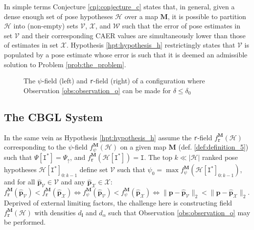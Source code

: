 In simple terms Conjecture \ref{cnj:conjecture_c} states that, in general,
given a dense enough set of pose hypotheses $\mathcal{H}$ over a map $\bm{M}$,
it is possible to partition $\mathcal{H}$ into (non-empty) sets $\mathcal{V}$,
$\mathcal{X}$, and $\mathcal{W}$ such that the error of pose estimates in set
$\mathcal{V}$ and their corresponding CAER values are simultaneously lower than
those of estimates in set $\mathcal{X}$. Hypothesis \ref{hpt:hypothesis_h}
restrictingly states that $\mathcal{V}$ is populated by a pose estimate
whose error is such that it is deemed an admissible solution to
Problem \ref{prob:the_problem}.

\begin{figure}
  
  \vspace{0.7cm}
  \caption{\small The $\psi$-field (left) and \texttt{r}-field (right) of a
           configuration where Observation \ref{obs:observation_o} can be made
           for $\delta \leq \delta_0$}
  \label{fig:h_fig1}
\end{figure}


\subsection{The CBGL System}

In the same vein as Hypothesis \ref{hpt:hypothesis_h} assume the \texttt{r}-field
$f_{\texttt{r}}^{\bm{M}}(\mathcal{H})$ corresponding to the $\psi$-field
$f_{\psi}^{\bm{M}}(\mathcal{H})$ on a given map $\bm{M}$ (def.
\ref{def:definition_5}) such that $\Psi[\texttt{I}^{\ast}] = \Psi_\uparrow$,
and $f_{\texttt{r}}^{\bm{M}}(\mathcal{H}[\texttt{I}^{\ast}]) = \texttt{I}$.
The top $k \ll |\mathcal{H}|$ ranked pose hypotheses
$\mathcal{H}[\texttt{I}^{\ast}]_{0:k-1}$ define set $\mathcal{V}$ such that
$\psi_0 = \max f_{\psi}^{\bm{M}}(\mathcal{H}[\texttt{I}^{\ast}]_{0:k-1})$,
and for all $\hat{\bm{p}}_\mathcal{V} \in \mathcal{V}$
and any $\hat{\bm{p}}_{\mathcal{X}} \in \mathcal{X}$:
$ f_{\texttt{r}}^{\bm{M}}(\hat{\bm{p}}_\mathcal{V}) < f_{\texttt{r}}^{\bm{M}}(\hat{\bm{p}}_{\mathcal{X}}) \Leftrightarrow
f_{\psi}^{\bm{M}}(\hat{\bm{p}}_\mathcal{V}) < f_{\psi}^{\bm{M}}(\hat{\bm{p}}_\mathcal{X}) \Leftrightarrow
\|\bm{p}-\hat{\bm{p}}_\mathcal{V}\|_2 < \|\bm{p}-\hat{\bm{p}}_{\mathcal{X}}\|_2$.
Deprived of external limiting factors, the challenge here is constructing
field $f_{\texttt{r}}^{\bm{M}}(\mathcal{H})$ with densities $d_{\bm{l}}$ and
$d_\alpha$ such that Observation \ref{obs:observation_o} may be performed.

